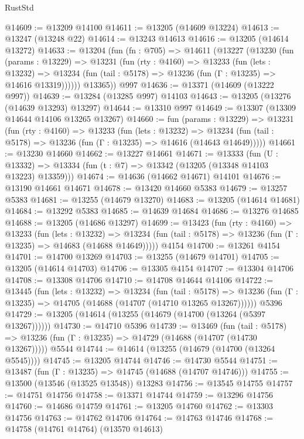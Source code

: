 \begin{lexlean}{RustStd}
\begin{coremodule}
@14609 := @13209 @14100
@14611 := @13205 (@14609 @13224)
@14613 := @13247 (@13248 @22)
@14614 := @13243 @14613
@14616 := @13205 (@14614 @13272)
@14633 := @13204
    (fun (fn : @705) =>
    @14611
      (@13227
        (@13230
          (fun (params : @13229) =>
          @13231
            (fun (rty : @4160) =>
            @13233
              (fun (lets : @13232) =>
              @13234 (fun (tail : @5178) => @13236 (fun (Γ : @13235) => @14616 @13319))))))
        @13365))
    @997
@14636 := @13371 (@14609 (@13222 @997))
@14639 := @13284 (@13285 @997) @14103
@14643 := @13205 (@13276 (@14639 @13293) @13297)
@14644 := @13310 @997
@14649 := @13307 (@13309 @14644 @14106 @13265 @13267)
@14660 := fun (params : @13229) =>
  @13231
    (fun (rty : @4160) =>
    @13233
      (fun (lets : @13232) =>
      @13234 (fun (tail : @5178) => @13236 (fun (Γ : @13235) => @14616 (@14643 @14649)))))
@14661 := @13230 @14660
@14662 := @13227 @14661
@14671 := @13333
    (fun (U : @13332) => @13334 (fun (t : @7) => @13342 (@13205 (@13348 @14103 @13223) @13359)))
@14674 := @14636 (@14662 @14671) @14101
@14676 := @13190 @14661 @14671
@14678 := @13420 @14660 @5383
@14679 := @13257 @5383
@14681 := @13255 (@14679 @13270)
@14683 := @13205 (@14614 @14681)
@14684 := @13292 @5383
@14685 := @14639 @14684
@14686 := @13276 @14685
@14688 := @13205 (@14686 @13297)
@14699 := @13423
    (fun (rty : @4160) =>
    @13233
      (fun (lets : @13232) =>
      @13234 (fun (tail : @5178) => @13236 (fun (Γ : @13235) => @14683 (@14688 @14649)))))
    @4154
@14700 := @13261 @4154
@14701 := @14700 @13269
@14703 := @13255 (@14679 @14701)
@14705 := @13205 (@14614 @14703)
@14706 := @13305 @4154
@14707 := @13304 @14706
@14708 := @13308 @14706
@14710 := @14708 @14644 @14106
@14722 := @13445
    (fun (lets : @13232) =>
    @13234
      (fun (tail : @5178) =>
      @13236 (fun (Γ : @13235) => @14705 (@14688 (@14707 (@14710 @13265 @13267))))))
    @5396
@14729 := @13205 (@14614 (@13255 (@14679 (@14700 (@13264 (@5397 @13267))))))
@14730 := @14710 @5396
@14739 := @13469
    (fun (tail : @5178) => @13236 (fun (Γ : @13235) => @14729 (@14688 (@14707 (@14730 @13267)))))
    @5544
@14744 := @14614 (@13255 (@14679 (@14700 (@13264 @5545))))
@14745 := @13205 @14744
@14746 := @14730 @5544
@14751 := @13487 (fun (Γ : @13235) => @14745 (@14688 (@14707 @14746)))
@14755 := @13500 (@13546 (@13525 @13548)) @13283
@14756 := @13545 @14755
@14757 := @14751 @14756
@14758 := @13371 @14744
@14759 := @13296 @14756
@14760 := @14686 @14759
@14761 := @13205 @14760
@14762 := @13303 @14756
@14763 := @14762 @14706
@14764 := @14763 @14746
@14768 := @14758 (@14761 @14764) (@13570 @14613)

\end{coremodule}
\end{lexlean}
